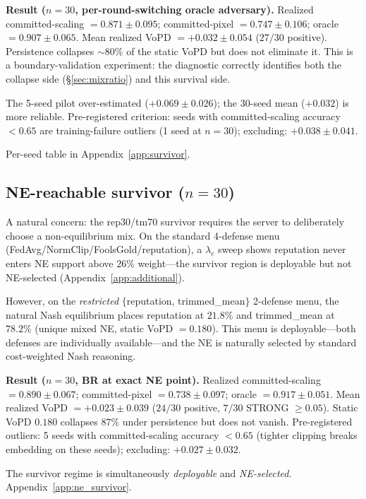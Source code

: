 \documentclass{article}
\begin{document}
\textbf{Result ($n=30$, per-round-switching oracle adversary).} Realized committed-scaling $= 0.871 \pm 0.095$; committed-pixel $= 0.747 \pm 0.106$; oracle $= 0.907 \pm 0.065$. Mean realized VoPD $= +0.032 \pm 0.054$ ($27/30$ positive). Persistence collapses $\sim 80\%$ of the static VoPD but does not eliminate it. This is a boundary-validation experiment: the diagnostic correctly identifies both the collapse side (§\ref{sec:mixratio}) and this survival side.

The 5-seed pilot over-estimated ($+0.069 \pm 0.026$); the 30-seed mean ($+0.032$) is more reliable. Pre-registered criterion: seeds with committed-scaling accuracy $< 0.65$ are training-failure outliers (1 seed at $n=30$); excluding: $+0.038 \pm 0.041$.

Per-seed table in Appendix~\ref{app:survivor}.

\subsection{NE-reachable survivor ($n=30$)}
\label{sec:ne_survivor}

A natural concern: the rep30/tm70 survivor requires the server to deliberately choose a non-equilibrium mix. On the standard 4-defense menu (FedAvg/NormClip/FoolsGold/reputation), a $\lambda_c$ sweep shows reputation never enters NE support above $26\%$ weight---the survivor region is deployable but not NE-selected (Appendix~\ref{app:additional}).

However, on the \emph{restricted} $\{$reputation, trimmed\_mean$\}$ 2-defense menu, the natural Nash equilibrium places reputation at $21.8\%$ and trimmed\_mean at $78.2\%$ (unique mixed NE, static VoPD $= 0.180$). This menu is deployable---both defenses are individually available---and the NE is naturally selected by standard cost-weighted Nash reasoning.

\textbf{Result ($n=30$, BR at exact NE point).} Realized committed-scaling $= 0.890 \pm 0.067$; committed-pixel $= 0.738 \pm 0.097$; oracle $= 0.917 \pm 0.051$. Mean realized VoPD $= +0.023 \pm 0.039$ ($24/30$ positive, $7/30$ STRONG $\geq 0.05$). Static VoPD $0.180$ collapses $87\%$ under persistence but does not vanish. Pre-registered outliers: 5 seeds with committed-scaling accuracy $< 0.65$ (tighter clipping breaks embedding on these seeds); excluding: $+0.027 \pm 0.032$.

The survivor regime is simultaneously \emph{deployable} and \emph{NE-selected}. Appendix~\ref{app:ne_survivor}.
\end{document}
